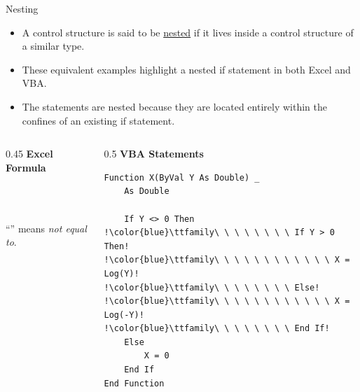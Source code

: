\documentclass{beamer}
\begin{document}
\begin{frame}[fragile]{Nesting}
\vspace{-0.4em}
\begin{itemize}
  \item A control structure is said to be \underline{nested} if it lives inside a control
        structure of a similar type.
  \item These equivalent examples highlight a nested if statement in both Excel and VBA.
  \item The  statements are nested because they are located entirely within
        the confines of an existing if statement.
\end{itemize}
\begin{columns}[T]
\begin{column}{0.45\textwidth}
\textbf{Excel Formula}

\footnotesize{}\\
\hspace*{1.5em}\\
\hspace*{1.5em}

\vspace{0.6em}
``\code{<>}'' means \emph{not equal to}.
\end{column}
\begin{column}{0.5\textwidth}
\textbf{VBA Statements}
\begin{lstlisting}[language=VBA,escapechar=!]
Function X(ByVal Y As Double) _
    As Double

    If Y <> 0 Then
!\color{blue}\ttfamily\ \ \ \ \ \ \ \ If Y > 0 Then!
!\color{blue}\ttfamily\ \ \ \ \ \ \ \ \ \ \ \ X = Log(Y)!
!\color{blue}\ttfamily\ \ \ \ \ \ \ \ Else!
!\color{blue}\ttfamily\ \ \ \ \ \ \ \ \ \ \ \ X = Log(-Y)!
!\color{blue}\ttfamily\ \ \ \ \ \ \ \ End If!
    Else
        X = 0
    End If
End Function
\end{lstlisting}
\end{column}
\end{columns}
\end{frame}
\end{document}
